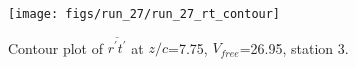 \begin{figure}[H]
\centering
\texttt{[image: figs/run\_27/run\_27\_rt\_contour]}
\caption{Contour plot of $\overline{r^\prime t^\prime}$ at $z/c$=7.75, $V_{free}$=26.95, station 3.}
\label{fig:run_27_rt_contour}
\end{figure}


